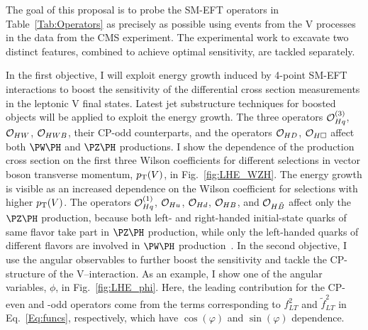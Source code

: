 \documentclass[a4paper,11pt]{article}
\renewcommand{\PV}{{{{V}}}\xspace}
\newcommand{\VH}{{{\PV}{\PH}}\xspace}
\begin{document}
The goal of this proposal is to probe the SM-EFT operators in Table~\ref{Tab:Operators}  as precisely as possible using events from the \VH processes in the data from the CMS experiment. 
The experimental work to excavate two distinct features, combined to achieve optimal sensitivity, are tackled separately.

In the first objective, I will exploit energy growth induced by 4-point SM-EFT interactions to boost the sensitivity of the differential cross section measurements in the leptonic \VH final states.
Latest jet substructure techniques for boosted objects will be applied to exploit the energy growth.
The three operators ${\cal O}^{(3)}_{Hq}$, ${\cal O}_{HW}$, ${\cal O}_{HWB}$, their CP-odd counterparts, and the operators ${\cal O}_{HD}$, ${\cal O}_{H\square}$ affect both $\PW\PH$ and $\PZ\PH$ productions. 
I show the dependence of the production cross section on the first three Wilson coefficients for different selections in vector boson transverse momentum, $\pt(\PV)$, in Fig.~\ref{fig:LHE_WZH}. 
The energy growth is visible as an increased dependence on the Wilson coefficient for selections with higher $\pt(\PV)$. %
The operators ${\cal O}^{(1)}_{Hq}$, ${\cal O}_{Hu}$, ${\cal O}_{Hd}$, ${\cal O}_{HB}$, and ${\cal O}_{H\tilde{B}}$ affect only the $\PZ\PH$ production, 
because both left- and right-handed initial-state quarks of same flavor take part in $\PZ\PH$ production, while only the left-handed quarks of different flavors are involved in $\PW\PH$ production~\cite{Falkowski:2014tna,Banerjee:2018bio}. 
In the second objective, I use the angular observables to further boost the sensitivity and tackle the CP-structure of the \PV--\PH interaction. 
As an example, I show one of the angular variables, $\phi$, in Fig.~\ref{fig:LHE_phi}. 
Here, the leading contribution for the CP-even and -odd operators come from the terms corresponding to $f^{2}_{LT}$ and $\tilde{f}^2_{LT}$ in Eq.~\eqref{Eq:funcs}, respectively, which have $\cos\left(\varphi\right)$ and $\sin\left(\varphi\right)$ dependence.
\end{document}
